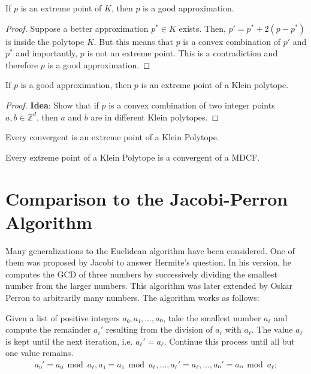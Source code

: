 \begin{lemma}
  If $p$ is an extreme point of $K$, then $p$ is a good approximation.
\end{lemma}

\begin{proof}
  Suppose a better approximation $p^* ∈ K$ exists.
  Then, $p' = p^* + 2(p - p^*)$ is inside the polytope $K$.
  But this means that $p$ is a convex combination of $p'$ and $p^*$ and
  importantly, $p$ is not an extreme point.
  This is a contradiction and therefore $p$ is a good approximation.
\end{proof}

\begin{lemma}
  If $p$ is a good approximation, then $p$ is an extreme point of a Klein polytope.
\end{lemma}

\begin{proof}
  \textbf{Idea}: Show that if $p$ is a convex combination of two integer points $a, b ∈ ℤ^d$,
  then $a$ and $b$ are in different Klein polytopes.
\end{proof}

\begin{theorem}
  Every convergent is an extreme point of a Klein Polytope.
\end{theorem}

\begin{theorem}
  Every extreme point of a Klein Polytope is a convergent of a MDCF.
\end{theorem}

\section{Comparison to the Jacobi-Perron Algorithm}

Many generalizations to the Euclidean algorithm have been considered.
One of them was proposed by Jacobi to answer Hermite's question.
In his version, he computes the GCD of three numbers by successively dividing
the smallest number from the larger numbers.
This algorithm was later extended by Oskar Perron to arbitrarily many numbers.
The algorithm works as follows:

Given a list of positive integers $a₀, a₁, …, aₙ$, take the smallest number $a_ℓ$
and compute the remainder $a_i'$ resulting from the division of $a_i$ with $a_ℓ$.
The value $a_ℓ$ is kept until the next iteration, i.e. $a_ℓ' = a_ℓ$.
Continue this process until all but one value remains.
\begin{align*}
  a₀' = a₀ \bmod a_ℓ, a₁ = a₁ \bmod a_ℓ, …, a_ℓ' = a_ℓ, …, aₙ' = aₙ \bmod a_ℓ; \\
\end{align*}


